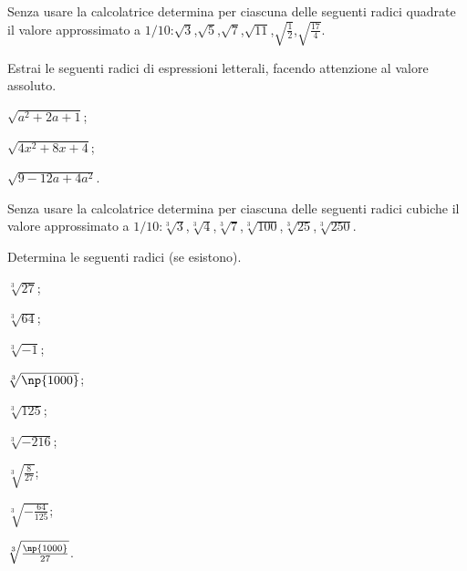\begin{esercizio}
 \label{ese:2.3}
Senza usare la calcolatrice determina per ciascuna delle seguenti radici quadrate il valore approssimato a $1/10$:\quad$\sqrt 3$,\quad$\sqrt 5$,\quad$\sqrt 7$,\quad$\sqrt{11}$,\quad$\sqrt{\frac 1 2}$,\quad$\sqrt{\frac{17} 4}$.
\end{esercizio}

\begin{esercizio}
 \label{ese:2.4}
Estrai le seguenti radici di espressioni letterali, facendo attenzione al valore assoluto.
\begin{multicols}{3}
\begin{enumeratea}
 \item $\sqrt{a^2+2a+1}$;
 \item $\sqrt{4x^2+8x+4}$;
 \item $\sqrt{9-12a+4a^2}$.
\end{enumeratea}
\end{multicols}
\end{esercizio}

 \begin{esercizio}
\label{ese:2.5}
Senza usare la calcolatrice determina per ciascuna delle seguenti radici cubiche il valore approssimato a $1/10$:\quad$\sqrt[3]3$,\quad$\sqrt[3]4$,\quad$\sqrt[3]7$,\quad$\sqrt[3]{100}$,\quad$\sqrt[3]{25}$,\quad$\sqrt[3]{250}$.
\end{esercizio}

\begin{esercizio}[\Ast]
 \label{ese:2.6}
Determina le seguenti radici (se esistono).
 \begin{multicols}{3}
 \begin{enumeratea}
 \item $\sqrt[3]{27}$;
 \item $\sqrt[3]{64}$;
 \item $\sqrt[3]{-1}$;
 \item $\sqrt[3]{\np{1000}}$;
 \item $\sqrt[3]{125}$;
 \item $\sqrt[3]{-216}$;
 \item $\sqrt[3]{\frac 8{27}}$;
 \item $\sqrt[3]{-\frac{64}{125}}$;
 \item $\sqrt[3]{\frac{\np{1000}}{27}}$.
 \end{enumeratea}
 \end{multicols}
\end{esercizio}

